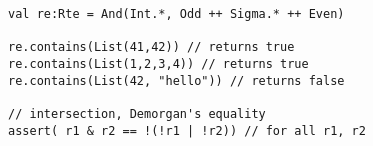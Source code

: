 \begin{lstlisting}[style=reclojureScala]
val re:Rte = And(Int.*, Odd ++ Sigma.* ++ Even)
      
re.contains(List(41,42)) // returns true
re.contains(List(1,2,3,4)) // returns true
re.contains(List(42, "hello")) // returns false

// intersection, Demorgan's equality
assert( r1 & r2 == !(!r1 | !r2)) // for all r1, r2
\end{lstlisting}
